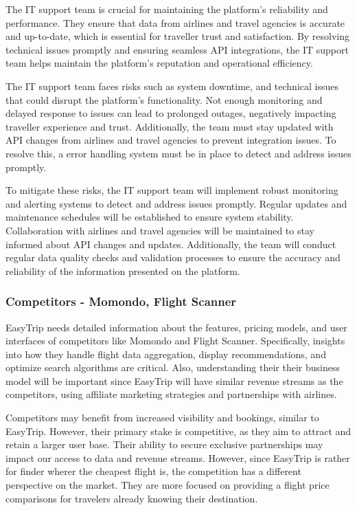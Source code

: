 The IT support team is crucial for maintaining the platform's reliability and performance. They ensure that data from airlines and travel agencies is accurate and up-to-date, which is essential for traveller trust and satisfaction. By resolving technical issues promptly and ensuring seamless API integrations, the IT support team helps maintain the platform's reputation and operational efficiency.


The IT support team faces risks such as system downtime, and technical issues that could disrupt the platform's functionality. Not enough monitoring and delayed response to issues can lead to prolonged outages, negatively impacting traveller experience and trust. Additionally, the team must stay updated with API changes from airlines and travel agencies to prevent integration issues. To resolve this, a error handling system must be in place to detect and address issues promptly.


To mitigate these risks, the IT support team will implement robust monitoring and alerting systems to detect and address issues promptly. Regular updates and maintenance schedules will be established to ensure system stability. Collaboration with airlines and travel agencies will be maintained to stay informed about API changes and updates. Additionally, the team will conduct regular data quality checks and validation processes to ensure the accuracy and reliability of the information presented on the platform.

\subsubsection{Competitors - Momondo, Flight Scanner}
EasyTrip needs detailed information about the features, pricing models, and user interfaces of competitors like Momondo and Flight Scanner. Specifically, insights into how they handle flight data aggregation, display recommendations, and optimize search algorithms are critical. Also, understanding their their business model will be important since EasyTrip will have similar revenue streams as the competitors, using affiliate marketing strategies and partnerships with airlines.


Competitors may benefit from increased visibility and bookings, similar to EasyTrip. However, their primary stake is competitive, as they aim to attract and retain a larger user base. Their ability to secure exclusive partnerships may impact our access to data and revenue streams. However, since EasyTrip is rather for finder wherer the cheapest flight is, the competition has a different perspective on the market. They are more focused on providing a flight price comparisons for travelers already knowing their destination.


